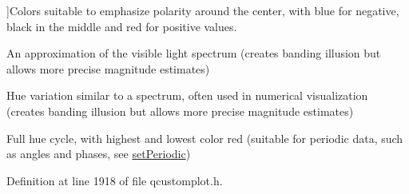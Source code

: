 \begin{Desc}
\begin{description}
{}]Colors suitable to emphasize polarity around the center, with blue for negative, black in the middle and red for positive values. \item[{\em 
\hypertarget{class_q_c_p_color_gradient_aed6569828fee337023670272910c9072ad63adc100ef46f6b4a8a6deacec4642f}{}gp\+Spectrum\label{class_q_c_p_color_gradient_aed6569828fee337023670272910c9072ad63adc100ef46f6b4a8a6deacec4642f}
}]An approximation of the visible light spectrum (creates banding illusion but allows more precise magnitude estimates) \item[{\em 
\hypertarget{class_q_c_p_color_gradient_aed6569828fee337023670272910c9072a5f8a9e67b64c17ddfe4f069fe2b9fb02}{}gp\+Jet\label{class_q_c_p_color_gradient_aed6569828fee337023670272910c9072a5f8a9e67b64c17ddfe4f069fe2b9fb02}
}]Hue variation similar to a spectrum, often used in numerical visualization (creates banding illusion but allows more precise magnitude estimates) \item[{\em 
\hypertarget{class_q_c_p_color_gradient_aed6569828fee337023670272910c9072a30efe58407acfb67939032f70213a130}{}gp\+Hues\label{class_q_c_p_color_gradient_aed6569828fee337023670272910c9072a30efe58407acfb67939032f70213a130}
}]Full hue cycle, with highest and lowest color red (suitable for periodic data, such as angles and phases, see \hyperlink{class_q_c_p_color_gradient_a39d6448155fc00a219f239220d14bb39}{set\+Periodic}) \end{description}
\end{Desc}


Definition at line 1918 of file qcustomplot.\+h.


